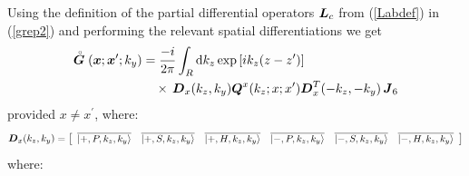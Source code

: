 \documentclass[11pt,a4paper]{article}
\newcommand{\bmi}[1]{\mbox{\boldmath$\mit #1$\unboldmath}}
\newcommand{\rf}[1]{\stackrel{\scriptscriptstyle _{\,\,\circ}}{ #1}}
\begin{document}
Using the definition of the
partial differential operators ${\bmi L}_{c }$ from (\ref{Labdef}) in (\ref{grep2}) and
performing the relevant spatial differentiations  we get
\begin{align} \label{Gxres}
\rf{\bmi G}({\bmi x};{\bmi x}^{\prime};k_y)&=\frac{- i}{2 \pi}
\int_{R} {\rm d}{ k}_{z} \exp \left[i { k}_{z} ({ z}-{
z}^{\prime})\right]\nonumber\\
&\quad\times\, {\bmi  D}_{x}({k}_{z},{k}_{y})
{\bmi Q}^{x}(k_z;x;x^{\prime}){\bmi  D}_{x}^{T}(-{k}_{z},-{k}_{y})
\,{\bmi  J}_6
\end{align}
provided $x \not = x^{\prime}$, where:\newline
\begin{equation} \label{Dxdef}
{\bmi D}_{x}(k_{z},k_{y})=\left[\begin{array}{cccccc}
\overline{\left|+,P, k_{z},k_{y}  \right\rangle}&\overline{\left|+,S, k_{z},k_{y}
\right\rangle}&\overline{\left|+,H, k_{z},k_{y}  \right\rangle}&
\overline{\left|-,P, k_{z},k_{y}  \right\rangle}&\overline{\left|-,S, k_{z},k_{y}
\right\rangle}&\overline{\left|-,H, k_{z},k_{y}  \right\rangle}
\end{array}\right]
\end{equation}
where:
\end{document}
